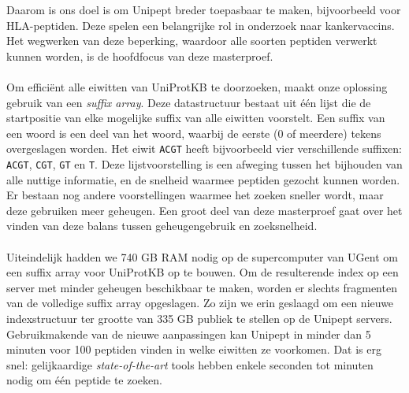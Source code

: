 Daarom is ons doel is om Unipept breder toepasbaar te maken, bijvoorbeeld voor HLA-peptiden.
Deze spelen een belangrijke rol in onderzoek naar kankervaccins.
Het wegwerken van deze beperking, waardoor alle soorten peptiden verwerkt kunnen worden, is de hoofdfocus van deze masterproef.
\\ \\
Om efficiënt alle eiwitten van UniProtKB te doorzoeken, maakt onze oplossing gebruik van een \textit{suffix array}.
Deze datastructuur bestaat uit één lijst die de startpositie van elke mogelijke suffix van alle eiwitten voorstelt.
Een suffix van een woord is een deel van het woord, waarbij de eerste (0 of meerdere) tekens overgeslagen worden.
Het eiwit \texttt{ACGT} heeft bijvoorbeeld vier verschillende suffixen:
\texttt{ACGT}, \texttt{CGT}, \texttt{GT} en \texttt{T}.
Deze lijstvoorstelling is een afweging tussen het bijhouden van alle nuttige informatie, en de snelheid waarmee peptiden gezocht kunnen worden.
Er bestaan nog andere voorstellingen waarmee het zoeken sneller wordt, maar deze gebruiken meer geheugen.
Een groot deel van deze masterproef gaat over het vinden van deze balans tussen geheugengebruik en zoeksnelheid.
\\ \\
Uiteindelijk hadden we 740 GB RAM nodig op de supercomputer van UGent om een suffix array voor UniProtKB op te bouwen.
Om de resulterende index op een server met minder geheugen beschikbaar te maken, worden er slechts fragmenten van de volledige suffix array opgeslagen.
Zo zijn we erin geslaagd om een nieuwe indexstructuur ter grootte van 335 GB publiek te stellen op de Unipept servers.
Gebruikmakende van de nieuwe aanpassingen kan Unipept in minder dan 5 minuten voor 100 peptiden vinden in welke eiwitten ze voorkomen.
Dat is erg snel: gelijkaardige \textit{state-of-the-art} tools hebben enkele seconden tot minuten nodig om één peptide te zoeken.
\afterpage{\blankpage}